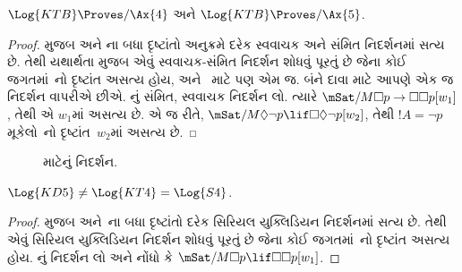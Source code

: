 \documentclass[../../../include/open-logic-section]{subfiles}
\begin{document}
\begin{thm}
  $\Log{KTB} \Proves/ \Ax{4}$ અને $\Log{KTB} \Proves/ \Ax{5}$.
\end{thm}

\begin{proof}
   મુજબ  અને ના બધા
  દૃષ્ટાંતો અનુક્રમે દરેક સ્વવાચક અને સંમિત નિદર્શનમાં સત્ય છે. તેથી
  યથાર્થતા મુજબ એવું સ્વવાચક-સંમિત નિદર્શન શોધવું પૂરતું છે જેના કોઈ
  જગતમાં~નો દૃષ્ટાંત અસત્ય હોય, અને~ માટે પણ એમ જ. બંને
  દાવા માટે આપણે એક જ નિદર્શન વાપરીએ છીએ.
  નું સંમિત, સ્વવાચક નિદર્શન લો. ત્યારે
  $\mSat/{M}{\Box p \to \Box \Box
    p}[w_1]$, તેથી  એ $w_1$માં અસત્ય છે. એ જ રીતે,
  $\mSat/{M}{\Diamond
    \lnot p \lif \Box \Diamond \lnot p}[w_2]$, તેથી $!A = \lnot p$
  મૂકેલો~નો દૃષ્ટાંત~$w_2$માં અસત્ય છે.
\end{proof}

\begin{figure}[htpb]
  \centering
  \caption{ માટેનું નિદર્શન.}
\end{figure}

\begin{thm}
  $\Log{KD5} \neq \Log{KT4} = \Log{S4}$.
\end{thm}

\begin{proof}
   મુજબ  અને~ના બધા
  દૃષ્ટાંતો દરેક સિરિયલ યુક્લિડિયન નિદર્શનમાં સત્ય છે. તેથી એવું
  સિરિયલ યુક્લિડિયન નિદર્શન શોધવું પૂરતું છે જેના કોઈ જગતમાં~નો
  દૃષ્ટાંત અસત્ય હોય. નું નિદર્શન લો અને નોંધો કે
  $\mSat/{M}{\Box p
  \lif \Box\Box p}[w_1]$.
\end{proof}
\end{document}
